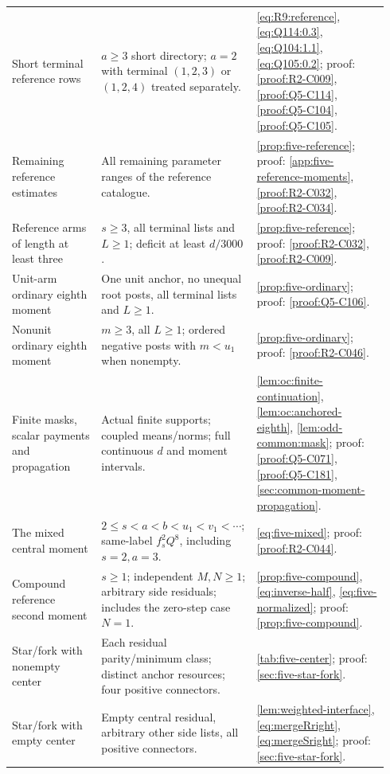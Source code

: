 \begin{longtable}{@{}p{0.23\linewidth}p{0.37\linewidth}p{0.34\linewidth}@{}}
\addlinespace[2pt]
Short terminal reference rows & $a\ge3$ short directory; $a=2$ with terminal $(1,2,3)$ or $(1,2,4)$ treated separately. & \eqref{eq:R9:reference}, \eqref{eq:Q114:0.3}, \eqref{eq:Q104:1.1}, \eqref{eq:Q105:0.2}; proof: \ref{proof:R2-C009}, \ref{proof:Q5-C114}, \ref{proof:Q5-C104}, \ref{proof:Q5-C105}. \\
\addlinespace[2pt]
Remaining reference estimates & All remaining parameter ranges of the reference catalogue. & \ref{prop:five-reference}; proof: \ref{app:five-reference-moments}, \ref{proof:R2-C032}, \ref{proof:R2-C034}. \\
\addlinespace[2pt]
Reference arms of length at least three & $s\ge3$, all terminal lists and $L\ge1$; deficit at least $d/3000$. & \ref{prop:five-reference}; proof: \ref{proof:R2-C032}, \ref{proof:R2-C009}. \\
\addlinespace[2pt]
Unit-arm ordinary eighth moment & One unit anchor, no unequal root posts, all terminal lists and $L\ge1$. & \ref{prop:five-ordinary}; proof: \ref{proof:Q5-C106}. \\
\addlinespace[2pt]
Nonunit ordinary eighth moment & $m\ge3$, all $L\ge1$; ordered negative posts with $m<u_1$ when nonempty. & \ref{prop:five-ordinary}; proof: \ref{proof:R2-C046}. \\
\addlinespace[2pt]
Finite masks, scalar payments and propagation & Actual finite supports; coupled means/norms; full continuous $d$ and moment intervals. & \ref{lem:oc:finite-continuation}, \ref{lem:oc:anchored-eighth}, \ref{lem:odd-common:mask}; proof: \ref{proof:Q5-C071}, \ref{proof:Q5-C181}, \ref{sec:common-moment-propagation}. \\
\addlinespace[2pt]
The mixed central moment & $2\le s<a<b<u_1<v_1<\cdots$; same-label $f_s^2Q^8$, including $s=2,a=3$. & \eqref{eq:five-mixed}; proof: \ref{proof:R2-C044}. \\
\addlinespace[2pt]
Compound reference second moment & $s\ge1$; independent $M,N\ge1$; arbitrary side residuals; includes the zero-step case $N=1$. & \ref{prop:five-compound}, \eqref{eq:inverse-half}, \eqref{eq:five-normalized}; proof: \ref{prop:five-compound}. \\
\addlinespace[2pt]
Star/fork with nonempty center & Each residual parity/minimum class; distinct anchor resources; four positive connectors. & \ref{tab:five-center}; proof: \ref{sec:five-star-fork}. \\
\addlinespace[2pt]
Star/fork with empty center & Empty central residual, arbitrary other side lists, all positive connectors. & \ref{lem:weighted-interface}, \eqref{eq:mergeRright}, \eqref{eq:mergeSright}; proof: \ref{sec:five-star-fork}. \\

\end{longtable}
